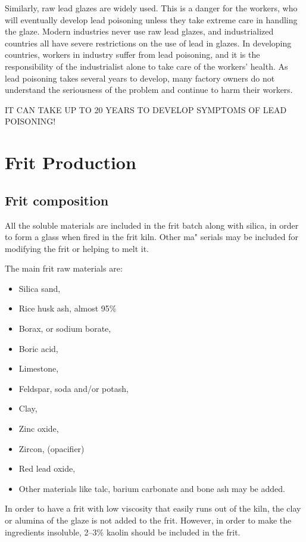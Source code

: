 Similarly, raw lead glazes are widely used. This is a danger for the workers, 
who will eventually develop lead poisoning unless they take extreme care in 
handling the glaze. Modern industries never use raw lead glazes, and 
industrialized countries all have severe restrictions on the use of lead in 
glazes. In developing countries, workers in industry suffer from lead 
poisoning, and it is the responsibility of the industrialist alone to take care 
of the workers' health. As lead poisoning takes several years to develop, many 
factory owners do not understand the seriousness of the problem and continue to 
harm their workers. 

IT CAN TAKE UP TO 20 YEARS TO DEVELOP SYMPTOMS OF LEAD POISONING!
\section{Frit Production}
\subsection{Frit composition}
All the soluble materials are included in the frit batch along with silica, in 
order to form a glass when fired in the frit kiln. Other ma" serials may be 
included for modifying the frit or helping to melt it.

The main frit raw materials are:
\begin{itemize}
\item Silica sand, 
\item Rice husk ash, almost 95\% 
\item Borax, or sodium borate, 
\item Boric acid, 
\item Limestone, 
\item Feldspar, soda and/or potash, 
\item Clay, 
\item Zinc oxide, 
\item Zircon,  (opacifier)
\item Red lead oxide, 
\item Other materials like talc, barium carbonate and bone ash may be added.
\end{itemize}
In order to have a frit with low viscosity that easily runs out of the kiln, 
the clay or alumina of the glaze is not added to the frit. However, in order to 
make the ingredients insoluble, 2--3\% kaolin should be included in the frit.
